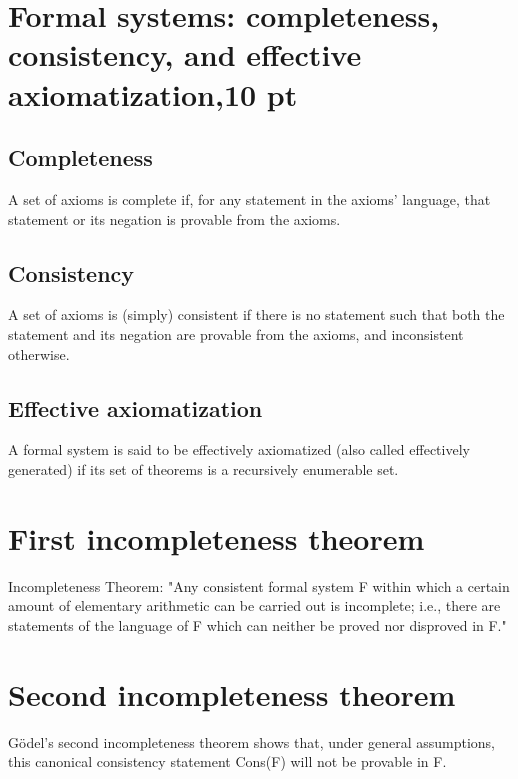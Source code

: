\documentclass[a4paper,10pt]{article} %
\begin{document}
\smallskip

\section{Formal systems: completeness, consistency, and effective axiomatization,10 pt}
\subsection{Completeness}
A set of axioms is complete if, for any statement in the axioms' language, that statement or its negation is provable from the axioms.

\subsection{Consistency}
A set of axioms is (simply) consistent if there is no statement such that both the statement and its negation are provable from the axioms, and inconsistent otherwise.

\subsection{Effective axiomatization}
A formal system is said to be effectively axiomatized (also called effectively generated) if its set of theorems is a recursively enumerable set.

\smallskip
\section{First incompleteness theorem}
Incompleteness Theorem: "Any consistent formal system F within which a certain amount of elementary arithmetic can be carried out is incomplete; i.e., there are statements of the language of F which can neither be proved nor disproved in F."

\section{Second incompleteness theorem}
Gödel's second incompleteness theorem shows that, under general assumptions, this canonical consistency statement Cons(F) will not be provable in F.
\end{document}
